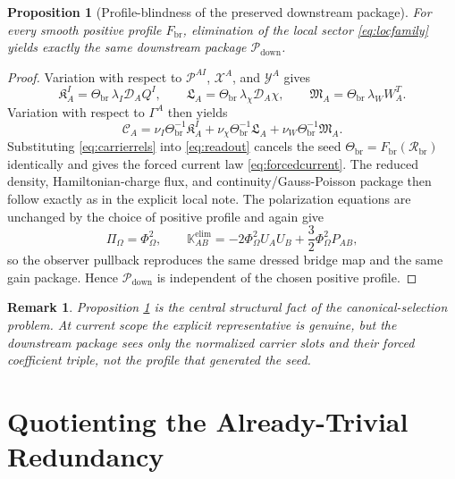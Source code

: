 \documentclass[11pt]{article}
\newcommand{\ProjSub}{P}
\newcommand{\SpatialD}{\mathcal D}
\newcommand{\FlowPot}{\Phi_\Omega}
\newcommand{\BalanceField}{\Pi_\Omega}
\newcommand{\ConstCurrent}{\mathcal C}
\newcommand{\ConstGamma}{\Gamma}
\newcommand{\CurvQMult}{\mathscr P}
\newcommand{\CurvChiMult}{\mathscr X}
\newcommand{\CurvTransMult}{\mathscr Y}
\newcommand{\AuxPol}{\mathbb K}
\newcommand{\CurvSeed}{\Theta_{\mathrm{br}}}
\newcommand{\CurvProfile}{F_{\mathrm{br}}}
\newcommand{\CurvOneI}{\mathfrak K}
\newcommand{\CurvOneChi}{\mathfrak L}
\newcommand{\CurvOneW}{\mathfrak M}
\newcommand{\BridgeCurv}{\mathcal R_{\mathrm{br}}}
\newcommand{\DownPkg}{\mathscr P_{\mathrm{down}}}
\newtheorem{proposition}{Proposition}
\newtheorem{remark}{Remark}
\begin{document}
\begin{proposition}[Profile-blindness of the preserved downstream package]
\label{prop:profileblind}
For every smooth positive profile \(\CurvProfile\), elimination of the local sector \eqref{eq:locfamily} yields exactly the same downstream package \(\DownPkg\).
\end{proposition}

\begin{proof}
Variation with respect to \(\CurvQMult^{AI}\), \(\CurvChiMult^A\), and \(\CurvTransMult^A\) gives
\begin{equation}
\CurvOneI_A^I=\CurvSeed\,\lambda_I\SpatialD_AQ^I,
\qquad
\CurvOneChi_A=\CurvSeed\,\lambda_\chi\SpatialD_A\chi,
\qquad
\CurvOneW_A=\CurvSeed\,\lambda_WW_A^T.
\label{eq:carrierrels}
\end{equation}
Variation with respect to \(\ConstGamma^A\) then yields
\begin{equation}
\ConstCurrent_A
=
\nu_I\CurvSeed^{-1}\CurvOneI_A^I
+\nu_\chi\CurvSeed^{-1}\CurvOneChi_A
+\nu_W\CurvSeed^{-1}\CurvOneW_A.
\label{eq:readout}
\end{equation}
Substituting \eqref{eq:carrierrels} into \eqref{eq:readout} cancels the seed \(\CurvSeed=\CurvProfile(\BridgeCurv)\) identically and gives the forced current law \eqref{eq:forcedcurrent}. The reduced density, Hamiltonian-charge flux, and continuity/Gauss-Poisson package then follow exactly as in the explicit local note. The polarization equations are unchanged by the choice of positive profile and again give
\begin{equation}
\BalanceField=\FlowPot^2,
\qquad
\AuxPol_{AB}^{\mathrm{elim}}
=
-2\FlowPot^2U_AU_B
+\frac32\FlowPot^2\ProjSub_{AB},
\label{eq:polsame}
\end{equation}
so the observer pullback reproduces the same dressed bridge map and the same gain package. Hence \(\DownPkg\) is independent of the chosen positive profile.
\end{proof}

\begin{remark}
Proposition \ref{prop:profileblind} is the central structural fact of the canonical-selection problem. At current scope the explicit representative is genuine, but the downstream package sees only the normalized carrier slots and their forced coefficient triple, not the profile that generated the seed.
\end{remark}

\section{Quotienting the Already-Trivial Redundancy}
\end{document}
